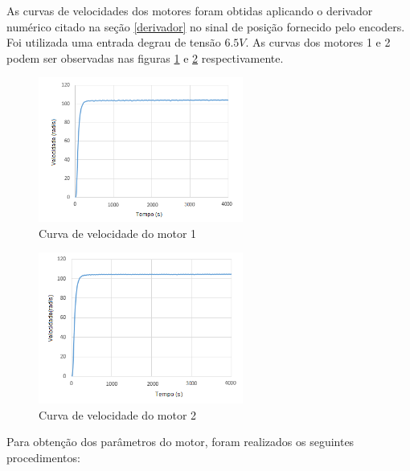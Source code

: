 \documentclass[]{politex}
\begin{document}
As curvas de velocidades dos motores foram obtidas aplicando o derivador numérico citado na seção \ref{derivador} no sinal de posição fornecido pelo encoders. Foi utilizada uma entrada degrau de tensão $6.5V$. As curvas dos motores 1 e 2 podem ser observadas nas figuras \ref{CM2} e \ref{CM3} respectivamente.

 \begin{figure}[H]
     \centering
     \includegraphics[width=0.6\textwidth]{imagens/velMotor1.png}
     \caption{Curva de velocidade do motor 1}
     \label{CM2}
 \end{figure}

 \begin{figure}[H]
     \centering
     \includegraphics[width=0.6\textwidth]{imagens/velMotor2.png}
     \caption{Curva de velocidade do motor 2}
     \label{CM3}
 \end{figure}

Para obtenção dos parâmetros do motor, foram realizados os seguintes procedimentos: 
\end{document}
